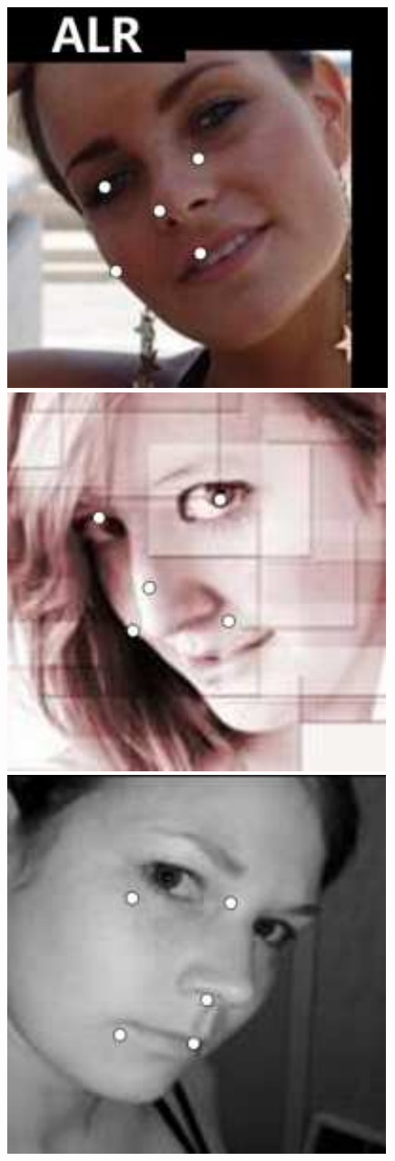 \documentclass[journal]{IEEEtran}
\begin{document}
\begin{figure}[!htb]
{\begin{minipage}[b]{0.38\textwidth}
\includegraphics[scale=0.22]{5_ALR_1186}
\includegraphics[scale=0.22]{5_ALR_500}
\includegraphics[scale=0.22]{5_ALR_2174}

\end{minipage}}
\end{figure}
\end{document}
